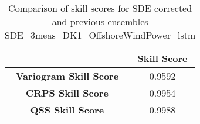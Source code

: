 
        \begin{table}[h!]
            \centering
            \begin{tabular}{|c|c|}
                \hline
                & \textbf{Skill Score}  \\
                \hline
                \textbf{Variogram Skill Score} & 0.9592  \\
                \hline
                \textbf{CRPS Skill Score} & 0.9954  \\
                \hline
                \textbf{QSS Skill Score} & 0.9988 \\
                \hline
            \end{tabular}
            \caption{Comparison of skill scores for SDE corrected and previous ensembles SDE_3meas_DK1_OffshoreWindPower_lstm}
            \label{table:skill_scores_comparison}
        \end{table}
        